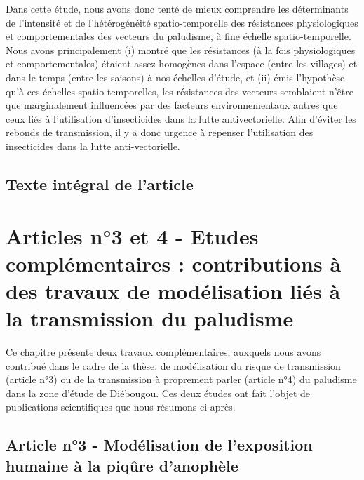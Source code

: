 \documentclass[12pt,twoside]{reedthesis}
\begin{document}
Dans cette étude, nous avons donc tenté de mieux comprendre les déterminants de l'intensité et de l'hétérogénéité spatio-temporelle des résistances physiologiques et comportementales des vecteurs du paludisme, à fine échelle spatio-temporelle. Nous avons principalement (i) montré que les résistances (à la fois physiologiques et comportementales) étaient assez homogènes dans l'espace (entre les villages) et dans le temps (entre les saisons) à nos échelles d'étude, et (ii) émis l'hypothèse qu'à ces échelles spatio-temporelles, les résistances des vecteurs semblaient n'être que marginalement influencées par des facteurs environnementaux autres que ceux liés à l'utilisation d'insecticides dans la lutte antivectorielle. Afin d'éviter les rebonds de transmission, il y a donc urgence à repenser l'utilisation des insecticides dans la lutte anti-vectorielle.

\hypertarget{texte-intuxe9gral-de-larticle}{%
\section{Texte intégral de l'article}\label{texte-intuxe9gral-de-larticle}}

\begingroup 
\renewcommand{\headrulewidth}{0pt}

\markboth{}{}


\endgroup

\hypertarget{complementary-studies}{%
\chapter{Articles n°3 et 4 - Etudes complémentaires : contributions à des travaux de modélisation liés à la transmission du paludisme}\label{complementary-studies}}

Ce chapitre présente deux travaux complémentaires, auxquels nous avons contribué dans le cadre de la thèse, de modélisation du risque de transmission (article n°3) ou de la transmission à proprement parler (article n°4) du paludisme dans la zone d'étude de Diébougou. Ces deux études ont fait l'objet de publications scientifiques que nous résumons ci-après.

\hypertarget{article-n3---moduxe9lisation-de-lexposition-humaine-uxe0-la-piquxfbre-danophuxe8le}{%
\section{Article n°3 - Modélisation de l'exposition humaine à la piqûre d'anophèle}\label{article-n3---moduxe9lisation-de-lexposition-humaine-uxe0-la-piquxfbre-danophuxe8le}}
\end{document}
